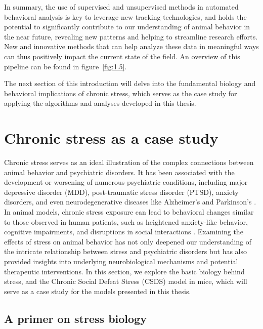 In summary, the use of supervised and unsupervised methods in automated behavioral analysis is key to leverage new tracking technologies, and holds the potential to significantly contribute to our understanding of animal behavior in the near future, revealing new patterns and helping to streamline research efforts. New and innovative methods that can help analyze these data in meaningful ways can thus positively impact the current state of the field. An overview of this pipeline can be found in figure~\ref{fig:1.5}.

The next section of this introduction will delve into the fundamental biology and behavioral implications of chronic stress, which serves as the case study for applying the algorithms and analyses developed in this thesis.

\section{Chronic stress as a case study}

Chronic stress serves as an ideal illustration of the complex connections between animal behavior and psychiatric disorders. It has been associated with the development or worsening of numerous psychiatric conditions, including major depressive disorder (MDD), post-traumatic stress disorder (PTSD), anxiety disorders, and even neurodegenerative diseases like Alzheimer's and Parkinson's \cite{Sanacora2021TheDisorders}. In animal models, chronic stress exposure can lead to behavioral changes similar to those observed in human patients, such as heightened anxiety-like behavior, cognitive impairments, and disruptions in social interactions \cite{Musazzi2016TheDisorders, Davis2017NeurobiologyStudies, Musazzi2018WhatDisorders}. Examining the effects of stress on animal behavior has not only deepened our understanding of the intricate relationship between stress and psychiatric disorders but has also provided insights into underlying neurobiological mechanisms and potential therapeutic interventions. In this section, we explore the basic biology behind stress, and the Chronic Social Defeat Stress (CSDS) model in mice, which will serve as a case study for the models presented in this thesis.

\subsection{A primer on stress biology}

